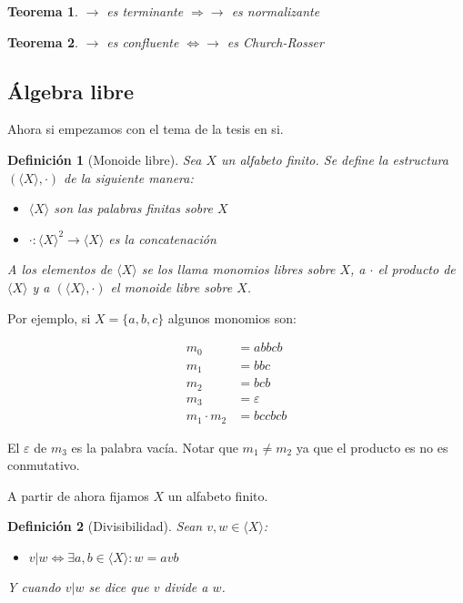 \documentclass{amsbook} %
\theoremstyle{customstyle}
\newtheorem{definition}{Definición}[section]
\newtheorem{theorem}{Teorema}[section]
\begin{document}
\begin{theorem}\label{thm:terminante ⇒ normalizante}
$→$ es terminante $⇒ →$ es normalizante
\end{theorem}

\begin{theorem}\label{thm:confluente ⇔ Church-Rosser}
$→$ es confluente $⇔ →$ es Church-Rosser
\end{theorem}

\subsection{Álgebra libre}

Ahora si empezamos con el tema de la tesis en si.

\begin{definition}[Monoide libre]
Sea $X$ un alfabeto finito. Se define la estructura $(⟨X⟩, ·)$ de la siguiente manera:
\begin{itemize}
\item $⟨X⟩$ son las palabras finitas sobre $X$
\item $· : ⟨X⟩^2 → ⟨X⟩$ es la concatenación
\end{itemize}
A los elementos de $⟨X⟩$ se los llama monomios libres sobre $X$, a $·$ el producto de $⟨X⟩$ y a $(⟨X⟩, ·)$ el monoide libre sobre $X$.
\end{definition}

Por ejemplo, si $X = \{a, b, c\}$ algunos monomios son:

\begin{align*}
m_0 &= abbcb \\
m_1 &= bbc \\
m_2 &= bcb \\
m_3 &= ε \\
m_1 · m_2 &= bccbcb
\end{align*}

El $ε$ de $m_3$ es la palabra vacía. Notar que $m_1 ≠ m_2$ ya que el producto es no es conmutativo.

A partir de ahora fijamos $X$ un alfabeto finito.

\begin{definition}[Divisibilidad]
Sean $v, w ∈ ⟨X⟩$:
\begin{itemize}
\item $v | w ⇔ ∃a , b ∈ ⟨X⟩ : w = avb$
\end{itemize}

Y cuando $v | w$ se dice que $v$ divide a $w$.
\end{definition}
\end{document}
